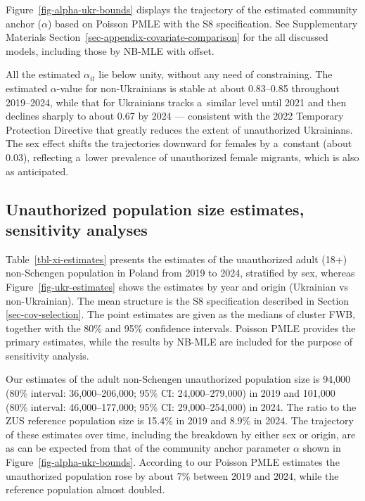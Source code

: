 



Figure~\ref{fig-alpha-ukr-bounds} displays the trajectory of the estimated community anchor ($\alpha$) based on Poisson PMLE with the S8 specification. See Supplementary Materials Section~\ref{sec-appendix-covariate-comparison} for the all discussed models, including those by NB-MLE with offset. 

All the estimated $\alpha_{it}$ lie below unity, without any need of constraining. The estimated $\alpha$-value for non-Ukrainians is stable at about 0.83--0.85 throughout 2019--2024, while that for Ukrainians tracks a~similar level until 2021 and then declines sharply to about 0.67 by 2024 --- consistent with the 2022 Temporary Protection Directive that greatly reduces the extent of unauthorized Ukrainians. The sex effect shifts the trajectories downward for females by a~constant (about 0.03), reflecting a~lower prevalence of unauthorized female migrants, which is also as anticipated. 


\subsection{Unauthorized population size estimates, sensitivity analyses}\label{sec-popsize}

Table~\ref{tbl-xi-estimates} presents the estimates of the unauthorized adult (18+) non-Schengen population in Poland from 2019 to 2024, stratified by sex, whereas Figure~\ref{fig-ukr-estimates} shows the estimates by year and origin (Ukrainian vs non-Ukrainian). The mean structure is the S8 specification described in Section \ref{sec-cov-selection}. The point estimates are given as the medians of cluster FWB, together with the 80\% and 95\% confidence intervals. Poisson PMLE provides the primary estimates, while the results by NB-MLE are included for the purpose of sensitivity analysis. 

Our estimates of the adult non-Schengen unauthorized population size is 94,000 (80\% interval: 36,000--206,000; 95\% CI: 24,000--279,000) in 2019 and 101,000
(80\% interval: 46,000--177,000; 95\% CI: 29,000--254,000) in 2024. The ratio to the ZUS reference population size is 15.4\% in 2019 and 8.9\% in 2024. The trajectory of these estimates over time, including the breakdown by either sex or origin, are as can be expected from that of the community anchor parameter $\alpha$ shown in Figure~\ref{fig-alpha-ukr-bounds}. According to our Poisson PMLE estimates the unauthorized population rose by about 7\% between 2019 and 2024, while the reference population almost doubled. 


